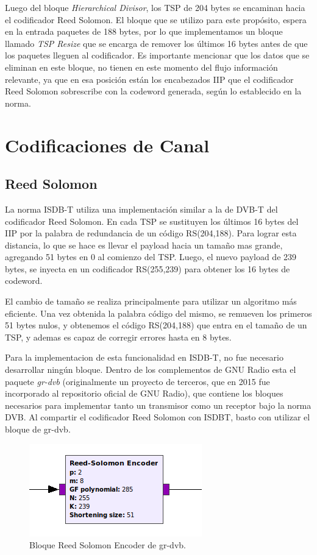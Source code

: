 Luego del bloque \textit{Hierarchical Divisor}, los TSP de 204 bytes se encaminan hacia el codificador Reed Solomon. El bloque que se utilizo para este propósito, espera en la entrada paquetes de 188 bytes, por lo que implementamos un bloque llamado \textit{TSP Resize} que se encarga de remover los últimos 16 bytes antes de que los paquetes lleguen al codificador. Es importante mencionar que los datos que se eliminan en este bloque, no tienen en este momento del flujo información relevante, ya que en esa posición están los encabezados IIP que el codificador Reed Solomon sobrescribe con la codeword generada, según lo establecido en la norma. 

\section{Codificaciones de Canal}

	\subsection{Reed Solomon}
La norma ISDB-T utiliza una implementación similar a la de DVB-T del codificador Reed Solomon. En cada TSP se sustituyen los últimos 16 bytes del IIP por la palabra de redundancia de un código RS(204,188). Para lograr esta distancia, lo que se hace es llevar el payload hacia un tamaño mas grande, agregando 51 bytes en 0 al comienzo del TSP. Luego, el nuevo payload de 239 bytes, se inyecta en un codificador RS(255,239) para obtener los 16 bytes de codeword. 

El cambio de tamaño se realiza principalmente para utilizar un algoritmo más eficiente. Una vez obtenida la palabra código del mismo, se remueven los primeros 51 bytes nulos, y obtenemos el código RS(204,188) que entra en el tamaño de un TSP, y ademas es capaz de corregir errores hasta en 8 bytes. 

Para la implementacion de esta funcionalidad en ISDB-T, no fue necesario desarrollar ningún bloque. Dentro de los complementos de GNU Radio esta el paquete \textit{gr-dvb}\cite{gr-dvb} (originalmente un proyecto de terceros, que en 2015 fue incorporado al repositorio oficial de GNU Radio), que contiene los bloques necesarios para implementar tanto un transmisor como un receptor bajo la norma DVB. Al compartir el codificador Reed Solomon con ISDBT, basto con utilizar el bloque de gr-dvb.

\begin{figure}[h!]
	\centering
	\includegraphics[scale=0.5]{figuras/cap05/RSencoder}
	\caption{\label{f:RSencoder} Bloque Reed Solomon Encoder de gr-dvb.}
\end{figure}

